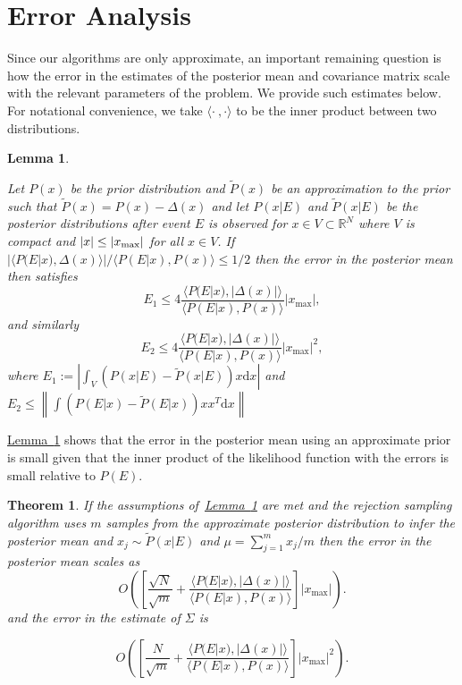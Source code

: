 \documentclass[twoside]{article}
\newtheorem{theorem}{Theorem}
\newtheorem{lemma}{Lemma}
\newcommand{\lem}[1]{\hyperref[lem:#1]{Lemma~\ref*{lem:#1}}}
\begin{document}
\section{Error Analysis}
\label{sec:error-analysis}

Since our algorithms are only approximate, an important remaining question is how the error in the estimates of the posterior mean
and covariance matrix scale with the relevant parameters of the problem.  We provide such estimates below.  For notational convenience,
we take $\langle \cdot\!~,\cdot \rangle$ to be the inner product between two distributions.

\begin{lemma}
    \label{lem:errprop}

    Let $P(x)$ be the prior distribution and $\tilde{P}(x)$ be an approximation to the prior such that $\tilde{P}(x) = P(x) -\Delta(x)$ and let $P(x|E)$ and $\tilde{P}(x|E)$ be the posterior distributions after event $E$ is observed for $x\in V\subset \mathbb{R}^N$ where $V$ is compact and $|x|\le |x_{\rm max}|$ for all $x\in V$.  If $|\langle P(E|x),\Delta(x) \rangle|/\langle P(E|x),P(x)\rangle \le 1/2$ then the error in the posterior mean then satisfies
    $$
    E_1 \le 4 \frac{\langle P(E|x), |\Delta(x)|\rangle}{\langle P(E|x),P(x)\rangle}|x_{\max}|,
    $$
    and similarly
    $$
    E_2 \le 4 \frac{\langle P(E|x), |\Delta(x)|\rangle}{\langle P(E|x),P(x)\rangle}|x_{\max}|^2,
    $$
where $E_1:=\left|\int_V  (P(x|E) -\tilde{P}(x|E)) x \mathrm{d} x \right|$ and $E_2 \le \left\|\int  (P(E|x) -\tilde{P}(E|x)) xx^T \mathrm{d} x \right\|$
\end{lemma}

\lem{errprop} shows that the error in the posterior mean using an approximate prior is small given that the inner product of the likelihood function with the errors is small relative to $P(E)$. 

\begin{theorem}\label{thm:meanCov}
If the assumptions of~\lem{errprop} are met and the rejection sampling algorithm uses $m$ samples from the approximate posterior distribution to infer the posterior mean  and $x_j\sim \tilde{P}(x|E)$ and $\mu=\sum_{j=1}^m x_j/m$ then the error in the posterior mean scales as
$$
 O\left(\left[\frac{\sqrt{N}}{\sqrt{m}} +\frac{\langle P(E|x), |\Delta(x)|\rangle}{\langle P(E|x),P(x)\rangle}\right]|x_{\max}|\right).
$$
and the error in the estimate of $\Sigma$ is

$$
 O\left(\left[\frac{{N} }{\sqrt{m}} +\frac{\langle P(E|x), |\Delta(x)|\rangle}{\langle P(E|x),P(x)\rangle}\right]|x_{\max}|^2\right).
$$
\end{theorem}
\end{document}
